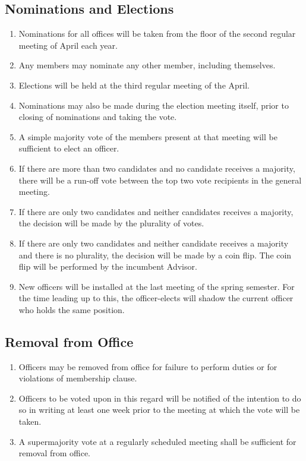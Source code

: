 \documentclass[12pt]{scrartcl} %
\begin{document}
	\subsection{Nominations and Elections}
		\begin{enumerate}
			\item Nominations for all offices will be taken from the floor of the second regular meeting of April each year.
			\item Any members may nominate any other member, including themselves.
			\item Elections will be held at the third regular meeting of the April.
			\item Nominations may also be made during the election meeting itself, prior to closing of nominations and taking the vote.
			\item A simple majority vote of the members present at that meeting will be sufficient to elect an officer.
			\item If there are more than two candidates and no candidate receives a majority, there will be a run-off vote between the top two vote recipients in the general meeting.
			\item If there are only two candidates and neither candidates receives a majority, the decision will be made by the plurality of votes.
			\item If there are only two candidates and neither candidate receives a majority and there is no plurality, the decision will be made by a coin flip.  The coin flip will be performed by the incumbent Advisor.
			\item New officers will be installed at the last meeting of the spring semester. For the time leading up to this, the officer-elects will shadow the current officer who holds the same position.
		\end{enumerate}

	\subsection{Removal from Office}
		\begin{enumerate}
			\item Officers may be removed from office for failure to perform duties or for violations of membership clause.
			\item Officers to be voted upon in this regard will be notified of the intention to do so in writing at least one week prior to the meeting at which the vote will be taken.
			\item A supermajority vote at a regularly scheduled meeting shall be sufficient for removal from office.
		\end{enumerate}
\end{document}

